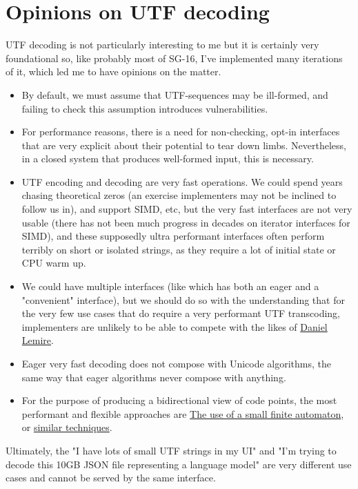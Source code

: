 \documentclass{wg21}
\begin{document}
\section{Opinions on UTF decoding}

UTF decoding is not particularly interesting to me but it is certainly very foundational so, like probably most of SG-16, I've implemented many iterations of it,
which led me to have opinions on the matter.

\begin{itemize}
\item By default, we must assume that UTF-sequences may be ill-formed, and failing to check this assumption introduces vulnerabilities.
\item For performance reasons, there is a need for non-checking, opt-in interfaces that are very explicit about their potential to tear down limbs. Nevertheless, in a closed system that produces well-formed input, this is necessary.
\item UTF encoding and decoding are very fast operations. We could spend years chasing theoretical zeros (an exercise implementers may not be inclined to follow us in), and support SIMD, etc, but the very fast interfaces are not very usable (there has not been much progress in decades on iterator interfaces for SIMD), and these supposedly ultra performant interfaces often perform terribly on short or isolated strings, as they require a lot of initial state or CPU warm up.
\item We could have multiple interfaces (like  which has both an eager and a "convenient" interface), but we should do so with the understanding that for the very few use cases that do require a very performant UTF transcoding,
implementers are unlikely to be able to compete with the likes of \href{https://arxiv.org/abs/2109.10433}{Daniel Lemire}.
\item Eager very fast decoding does not compose with Unicode algorithms, the same way that eager algorithms never compose with anything.
\item For the purpose of producing a bidirectional view of code points, the most performant and flexible approaches are
\href{https://nullprogram.com/blog/2017/10/06/}{The use of a small finite automaton}, or \href{https://github.com/skeeto/branchless-utf8/blob/master/utf8.h}{similar techniques}.
\end{itemize}

Ultimately, the "I have lots of small UTF strings in my UI" and "I'm trying to decode this 10GB JSON file representing a language model" are very different use cases and cannot be served by the same interface.
\end{document}
